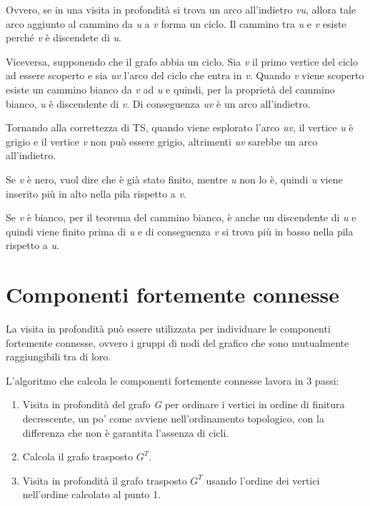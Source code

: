 Ovvero, se in una visita in profondità si trova un arco all'indietro \textit{vu}, 
allora tale arco aggiunto al cammino da \textit{u} a \textit{v} forma un ciclo.
Il cammino tra \textit{u} e \textit{v} esiste perché \textit{v} è discendete di \textit{u}.

Viceversa, supponendo che il grafo abbia un ciclo. 
Sia \textit{v} il primo vertice del ciclo ad essere scoperto e
sia \textit{uv} l’arco del ciclo che entra in \textit{v}.
Quando \textit{v} viene scoperto esiste un cammino bianco da \textit{v} ad \textit{u} e quindi, per la proprietà del cammino bianco, \textit{u} è discendente di \textit{v}.
Di conseguenza \textit{uv} è un arco all’indietro.

Tornando alla correttezza di \textsc{TS}, quando viene esplorato l'arco
\emph{uv}, il vertice \emph{u} è grigio e il vertice \emph{v} non può
essere grigio, altrimenti \emph{uv} sarebbe un arco all'indietro.

Se \emph{v} è nero, vuol dire che è già stato finito, mentre \emph{u}
non lo è, quindi \emph{u} viene inserito più in alto nella pila rispetto
a \emph{v}.

Se \emph{v} è bianco, per il teorema del cammino bianco, è anche un
discendente di \emph{u} e quindi viene finito prima di \emph{u} e di
conseguenza \emph{v} si trova più in basso nella pila rispetto a
\emph{u}.

\section{Componenti fortemente connesse}\label{componenti-fortemente-connesse}

La visita in profondità può essere utilizzata per individuare le
componenti fortemente connesse, ovvero i gruppi di nodi del grafico che
sono mutualmente raggiungibili tra di loro.

L'algoritmo che calcola le componenti fortemente connesse lavora in 3
passi:

\begin{enumerate}
\item
  Visita in profondità del grafo \emph{G} per ordinare i vertici in
  ordine di finitura decrescente, un po' come avviene nell'ordinamento
  topologico, con la differenza che non è garantita l'assenza di cicli.
\item
  Calcola il grafo trasposto $G^T$.
\item
  Visita in profondità il grafo trasposto $G^T$ usando l'ordine
  dei vertici nell'ordine calcolato al punto 1.
\end{enumerate}

